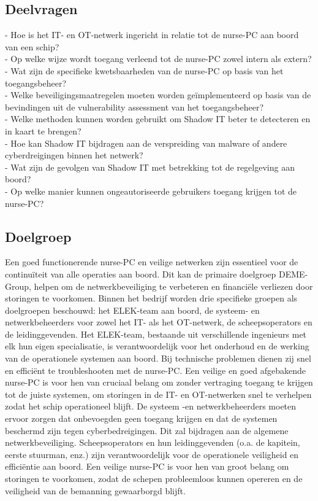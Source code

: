 \subsection{Deelvragen}
- Hoe is het IT- en OT-netwerk ingericht in relatie tot de nurse-PC aan boord van een schip? \\     
- Op welke wijze wordt toegang verleend tot de nurse-PC zowel intern als extern? \\    
- Wat zijn de specifieke kwetsbaarheden van de nurse-PC op basis van het toegangsbeheer? \\       
- Welke beveiligingsmaatregelen moeten worden geïmplementeerd op basis van de bevindingen uit de vulnerability assessment van het toegangsbeheer? \\
- Welke methoden kunnen worden gebruikt om Shadow IT beter te detecteren en in kaart te brengen? \\
- Hoe kan Shadow IT bijdragen aan de verspreiding van malware of andere cyberdreigingen binnen het netwerk?\\
- Wat zijn de gevolgen van Shadow IT met betrekking tot de regelgeving aan boord?\\
- Op welke manier kunnen ongeautoriseerde gebruikers toegang krijgen tot de nurse-PC?\\

\subsection{Doelgroep}
Een goed functionerende nurse-PC en veilige netwerken zijn essentieel voor de continuïteit van alle operaties aan boord. 
Dit kan de primaire doelgroep DEME-Group, helpen om de netwerkbeveiliging te verbeteren en financiële verliezen door storingen te voorkomen.
Binnen het bedrijf worden drie specifieke groepen als doelgroepen beschouwd: het ELEK-team aan boord, de systeem- en netwerkbeheerders voor zowel het IT- als het OT-netwerk, de scheepsoperators en de leidinggevenden.
Het ELEK-team, bestaande uit verschillende ingenieurs met elk hun eigen specialisatie, is verantwoordelijk voor het onderhoud en de werking van de operationele systemen aan boord. Bij technische problemen dienen zij snel en efficiënt te troubleshooten met de nurse-PC.  
Een veilige en goed afgebakende nurse-PC is voor hen van cruciaal belang om zonder vertraging toegang te krijgen tot de juiste systemen, om storingen in de IT- en OT-netwerken snel te verhelpen zodat het schip operationeel blijft.
De systeem -en netwerkbeheerders moeten ervoor zorgen dat onbevoegden geen toegang krijgen en dat de systemen beschermd zijn tegen cyberbedreigingen. Dit zal bijdragen aan de algemene netwerkbeveiliging.
Scheepsoperators en hun leidinggevenden (o.a. de kapitein, eerste stuurman, enz.) zijn verantwoordelijk voor de operationele veiligheid en efficiëntie aan boord. Een veilige nurse-PC is voor hen van groot belang om storingen te voorkomen, 
zodat de schepen probleemloos kunnen opereren en de veiligheid van de bemanning gewaarborgd blijft.

